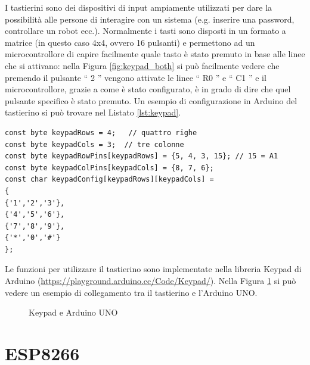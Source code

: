 \documentclass[12pt]{report}
\begin{document}
I tastierini sono dei dispositivi di input ampiamente utilizzati per dare la possibilità alle persone di interagire con un sistema (e.g$.$ inserire una password, controllare un robot ecc.). Normalmente i tasti sono disposti in un formato a matrice (in questo caso 4x4, ovvero 16 pulsanti) e permettono ad un microcontrollore di capire facilmente quale tasto è stato premuto in base alle linee che si attivano: nella Figura \ref{fig:keypad_both} si può facilmente vedere che premendo il pulsante \textquotedblleft{} 2 \textquotedblright{} vengono attivate le linee \textquotedblleft{} R0 \textquotedblright{} e \textquotedblleft{} C1 \textquotedblright{} e il microcontrollore, grazie a come è stato configurato, è in grado di dire che quel pulsante specifico è stato premuto. Un esempio di configurazione in Arduino del tastierino si può trovare nel Listato \ref{lst:keypad}. 
\begin{lstlisting}[caption={Configurazione dei pin del tastierino. In questo caso non viene utilizzata l'ultima colonna con le lettere.}, label={lst:keypad}]
const byte keypadRows = 4;   // quattro righe
const byte keypadCols = 3;  // tre colonne
const byte keypadRowPins[keypadRows] = {5, 4, 3, 15}; // 15 = A1
const byte keypadColPins[keypadCols] = {8, 7, 6};
const char keypadConfig[keypadRows][keypadCols] =
{
{'1','2','3'},
{'4','5','6'},
{'7','8','9'},
{'*','0','#'}
};
\end{lstlisting}

Le funzioni per utilizzare il tastierino sono implementate nella libreria Keypad di Arduino (\url{https://playground.arduino.cc/Code/Keypad/}). Nella Figura \ref{fig:keypad_uno} si può vedere un esempio di collegamento tra il tastierino e l'Arduino UNO.


\begin{figure}[H]
	\caption{Keypad e Arduino UNO}
	\label{fig:keypad_uno}
\end{figure}


%
\section{ESP8266}\label{sec:esp8266}
%
\end{document}
